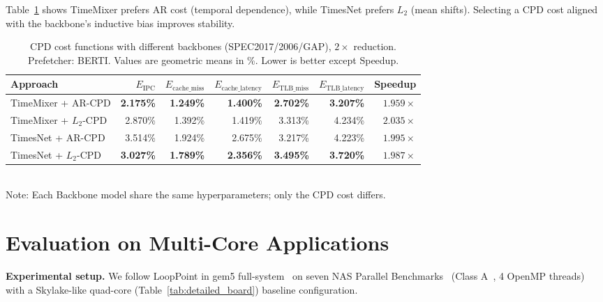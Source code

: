 Table~\ref{tab:sensitivity_cpd_onecol} shows TimeMixer prefers AR cost (temporal dependence), while TimesNet prefers $L_2$ (mean shifts). Selecting a CPD cost aligned with the backbone’s inductive bias improves stability.
\begin{table}[htbp!]
  \caption{CPD cost functions with different backbones (SPEC2017/2006/GAP), $2\times$ reduction. Prefetcher: BERTI. Values are geometric means in \%. Lower is better except Speedup.}
  \label{tab:sensitivity_cpd_onecol}
  \centering
  \setlength{\tabcolsep}{2pt}
  \begin{adjustbox}{max width=1.0\columnwidth}
  \begin{tabular}{l|rrrrrr}
  \toprule
  Approach &  $E_{\text{IPC}}$  & $E_{\text{cache\_miss}}$  &$E_{\text{cache\_latency}}$  & $E_{\text{TLB\_miss}}$    & $E_{\text{TLB\_latency}}$   & Speedup\\
  \midrule
  \footnotesize TimeMixer + AR-CPD    & \textbf{2.175\%} & \textbf{1.249\%} & \textbf{1.400\%} & \textbf{2.702\%} & \textbf{3.207\%} & $1.959\times$ \\
  \footnotesize TimeMixer + $L_2$-CPD  & 2.870\% & 1.392\% & 1.419\% & 3.313\% & 4.234\% & \textbf{$2.035\times$} \\
  \midrule
  \footnotesize TimesNet + AR-CPD     & 3.514\% & 1.924\% & 2.675\% & 3.217\% & 4.223\% & $1.995\times$ \\
   \footnotesize TimesNet + $L_2$-CPD     & \textbf{3.027\%} & \textbf{1.789\%} & \textbf{2.356\%} & \textbf{3.495\%} & \textbf{3.720\%} & $1.987\times$ \\
  \bottomrule
  \end{tabular}
  \end{adjustbox}
  \vspace{0.25ex}
  \\
  \footnotesize Note: Each Backbone model share the same hyperparameters; only the CPD cost differs.
\end{table}

\section{Evaluation on Multi-Core Applications} 
\label{evaluation_mc}
\textbf{Experimental setup.} We follow LoopPoint in gem5 full-system~\cite{LoopPointTutorialHPCA23} on seven NAS Parallel Benchmarks~\cite{npb_benchmark} (Class A~\cite{npb_input_size}, 4 OpenMP threads) with a Skylake-like quad-core (Table~\ref{tab:detailed_board}) baseline configuration.

